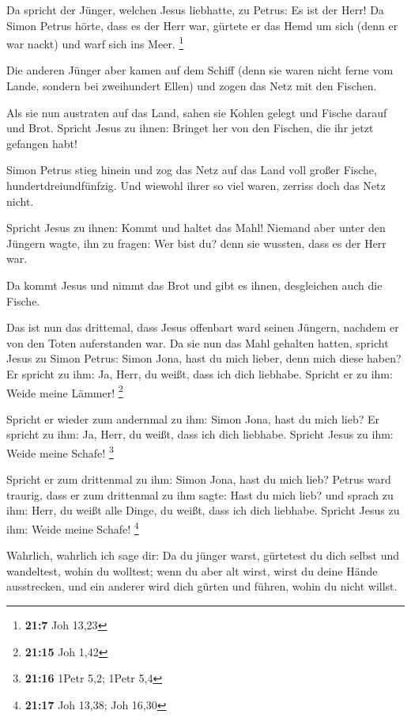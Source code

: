  Da spricht der Jünger, welchen Jesus liebhatte, zu
Petrus: Es ist der Herr! Da Simon Petrus hörte, dass es der Herr war,
gürtete er das Hemd um sich (denn er war nackt) und warf sich ins Meer.
\footnote{\textbf{21:7} Joh 13,23}

 Die anderen Jünger aber kamen auf dem Schiff (denn sie
waren nicht ferne vom Lande, sondern bei zweihundert Ellen) und zogen
das Netz mit den Fischen.

 Als sie nun austraten auf das Land, sahen sie Kohlen
gelegt und Fische darauf und Brot.  Spricht Jesus zu
ihnen: Bringet her von den Fischen, die ihr jetzt gefangen habt!

 Simon Petrus stieg hinein und zog das Netz auf das Land
voll großer Fische, hundertdreiundfünfzig. Und wiewohl ihrer so viel
waren, zerriss doch das Netz nicht.

 Spricht Jesus zu ihnen: Kommt und haltet das Mahl!
Niemand aber unter den Jüngern wagte, ihn zu fragen: Wer bist du? denn
sie wussten, dass es der Herr war.

 Da kommt Jesus und nimmt das Brot und gibt es ihnen,
desgleichen auch die Fische.

 Das ist nun das drittemal, dass Jesus offenbart ward
seinen Jüngern, nachdem er von den Toten auferstanden war.
 Da sie nun das Mahl gehalten hatten, spricht Jesus zu
Simon Petrus: Simon Jona, hast du mich lieber, denn mich diese haben? Er
spricht zu ihm: Ja, Herr, du weißt, dass ich dich liebhabe. Spricht er
zu ihm: Weide meine Lämmer! \footnote{\textbf{21:15} Joh 1,42}

 Spricht er wieder zum andernmal zu ihm: Simon Jona, hast
du mich lieb? Er spricht zu ihm: Ja, Herr, du weißt, dass ich dich
liebhabe. Spricht Jesus zu ihm: Weide meine Schafe! \footnote{\textbf{21:16}
  1Petr 5,2; 1Petr 5,4}

 Spricht er zum drittenmal zu ihm: Simon Jona, hast du
mich lieb? Petrus ward traurig, dass er zum drittenmal zu ihm sagte:
Hast du mich lieb? und sprach zu ihm: Herr, du weißt alle Dinge, du
weißt, dass ich dich liebhabe. Spricht Jesus zu ihm: Weide meine Schafe!
\footnote{\textbf{21:17} Joh 13,38; Joh 16,30}

 Wahrlich, wahrlich ich sage dir: Da du jünger warst,
gürtetest du dich selbst und wandeltest, wohin du wolltest; wenn du aber
alt wirst, wirst du deine Hände ausstrecken, und ein anderer wird dich
gürten und führen, wohin du nicht willst.

